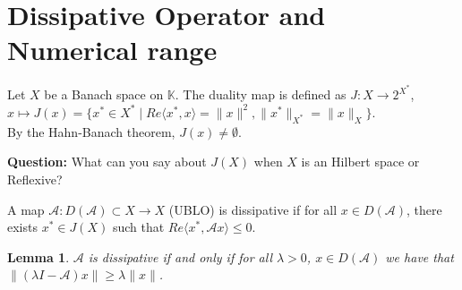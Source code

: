 \documentclass[12pt, oneside]{book}
\newtheorem{lemma}{Lemma}[section]
\begin{document}
\section{Dissipative Operator and Numerical range}
\begin{definition}
	Let $X$ be a Banach space on $\mathbb{K}$. The duality map is defined as $J:X\longrightarrow 2^{X^*}$, $x\mapsto J(x)=\{x^*\in X^*\mid Re\langle x^*,x\rangle=\|x\|^2, \|x^*\|_{X^*}=\|x\|_X\}$.\\
	By the Hahn-Banach theorem, $J(x)\neq \emptyset$.
\end{definition}
\textbf{Question:} What can you say about $J(X)$ when $X$ is an Hilbert space or Reflexive?
\begin{definition}
	A map $\mathscr{A}:D(\mathscr{A})\subset X\longrightarrow X$ (UBLO) is dissipative if for all $x\in D(\mathscr{A})$, there exists $x^*\in J(X)$ such that $Re\langle x^*,\mathscr{A}x\rangle \leq 0$.
\end{definition}
\begin{lemma}\label{lem1.4.1}
	$\mathscr{A}$ is dissipative if and only if for all $\lambda> 0$, $x\in D(\mathscr{A})$ we have that \\ $\|(\lambda I-\mathscr{A})x\|\geq \lambda \|x\|$.
\end{lemma}
\end{document}
